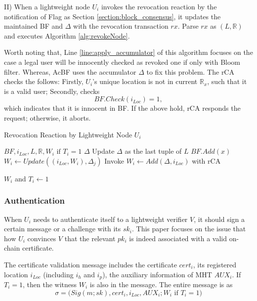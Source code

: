 \documentclass[conference]{IEEEtran}
\begin{document}
II) When a lightweight node $U_i$ invokes the revocation reaction by the notification of Flag as Section \ref{section:block_consensus}, it updates the maintained BF and $\Delta$ with the revocation transaction $rx$. Parse $rx$ as $(L, \mathbb{R})$ and executes Algorithm \ref{alg:revokeNode}.

Worth noting that, Line \ref{line:apply_accumulator} of this algorithm focuses on the case a legal user will be innocently checked as revoked one if only with Bloom filter. Whereas, AcBF uses the accumulator $\Delta$ to fix this problem. 
The rCA checks the follows: Firstly, $U_i$'s unique location is not in current $\mathbb{R}_x$, such that it is a valid user; Secondly, checks 
$$BF.Check(i_{Loc}) = 1,$$
which indicates that it is innocent in BF. If the above hold, rCA responds the request; otherwise, it aborts.

\begin{algorithm}[t]
	\renewcommand{\algorithmicensure}{\textbf{Output:}}
	\caption{Revocation Reaction by Lightweight Node $U_i$}\label{alg:revokeNode}
	\begin{algorithmic}[1]
		\Require $BF, i_{Loc}, L, \mathbb{R}, W_i \text{ if } T_i=1$
		\Ensure $\Delta$
		\State Update $\Delta$ as the last tuple of $L$
		\EndIf
		\State $BF.Add(x)$ 
		\EndFor
		\State $W_i\gets Update((i_{Loc}, W_i), \Delta_j)$ 
		\EndFor
		\State Invoke $W_i \gets Add(\Delta, i_{Loc})$ with rCA \label{line:apply_accumulator}
		
		\Return $W_i$ and $T_i \gets 1$
		\EndIf
	\end{algorithmic}
\end{algorithm}

\subsubsection{Authentication}\label{section:authentication}
When $U_i$ needs to authenticate itself to a lightweight verifier $V$, it should sign a certain message or a challenge with its $sk_i$. This paper focuses on the issue that how $U_i$ convinces $V$ that the relevant $pk_i$ is indeed associated with a valid on-chain certificate.

The certificate validation message includes the certificate $cert_i$, its registered location $i_{Loc}$ (including $i_h$ and $i_p$), the auxiliary information of MHT $AUX_i$. If $T_i =1$, then the witness $W_i$ is also in the message. The entire message is as 
$$\sigma = \biggl(Sig(m; sk), cert_i, i_{Loc}, AUX_i; W_i \text{ if } T_i =1 \biggr)$$
\end{document}
